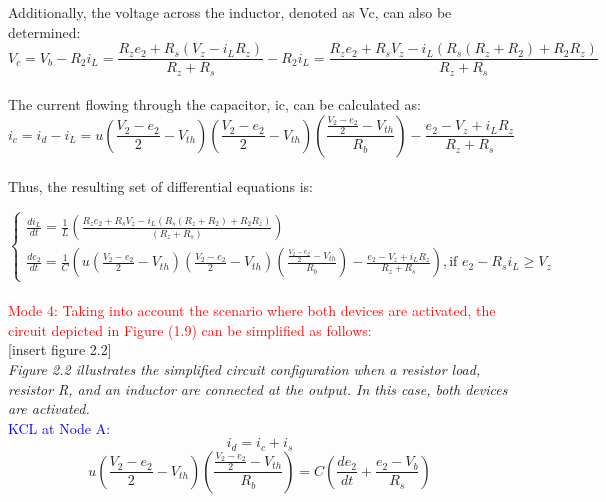 Additionally, the voltage across the inductor, denoted as Vc, can also be determined:\\

\begin{equation}
    V_c=V_b-R_2i_L=\frac{R_ze_2+R_s(V_z-i_LR_z)}{R_z+R_s}-R_2i_L=\frac{R_ze_2+R_sV_z-i_L(R_s(R_z+R_2)+R_2R_z)}{R_z+R_s}
\end{equation}\\

The current flowing through the capacitor, ic, can be calculated as:\\

\begin{equation}
    i_c=i_d-i_L=u(\frac{V_2-e_2}{2}-V_{th})(\frac{V_2-e_2}{2}-V_{th})(\frac{\frac{V_2-e_2}{2}-V_{th}}{R_b})-\frac{e_2-V_z+i_LR_z}{R_z+R_s}
\end{equation}\\

Thus, the resulting set of differential equations is:

\begin{equation}
    \begin{cases}
        \frac{di_L}{dt}=\frac{1}{L}(\frac{R_ze_2+R_sV_z-i_L(R_s(R_z+R_2)+R_2R_z)}{(R_z+R_s)})\\
        \frac{de_2}{dt}=\frac{1}{C}(u(\frac{V_2-e_2}{2}-V_{th})(\frac{V_2-e_2}{2}-V_{th})(\frac{\frac{V_2-e_2}{2}-V_{th}}{R_b})-\frac{e_2-V_z+i_LR_z}{R_z+R_s}),  \text{if } e_2-R_si_L \geq V_z
    \end{cases}
\end{equation}\\

\large\textcolor{red}{Mode 4: Taking into account the scenario where both devices are activated, the circuit depicted in Figure (1.9) can be simplified as follows:}\\

[insert figure 2.2]\\

\emph{Figure 2.2 illustrates the simplified circuit configuration when a resistor load, resistor R, and an inductor are connected at the output. In this case, both devices are activated.}\\

\textcolor{blue}{KCL at Node A:}\\
\begin{equation}
    i_d=i_c+i_s
\end{equation}
\begin{equation}
    u(\frac{V_2-e_2}{2}-V_{th})(\frac{\frac{V_2-e_2}{2}-V_{th}}{R_b})=C(\frac{de_2}{dt}+\frac{e_2-V_b}{R_s})
\end{equation}\\

